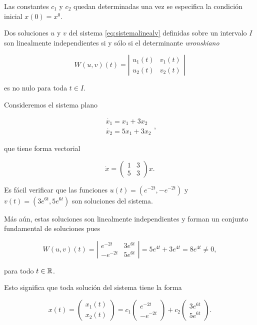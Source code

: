 Las constantes $c_1$ y $c_2$ quedan determinadas una vez se especifica la condición inicial $x(0) = x^0$.

\begin{lemma}
Dos soluciones $u$ y $v$ del sistema \ref{eq:sistemalinealv} definidas sobre un intervalo $I$ son linealmente independientes si y sólo si el determinante \emph{wronskiano}

$$ W(u,v)(t) = \left|
	\begin{array}{ll}
		u_1(t) & v_1(t) \\
		u_2(t) & v_2(t)
	\end{array}
\right|$$

es no nulo para toda $t \in I$.
\end{lemma}

\begin{example}
Consideremos el sistema plano

$$
	\begin{array}{l}
		\dot{x_1} = x_1 + 3x_2 \\
		\dot{x_2} = 5x_1 + 3x_2
	\end{array},
$$

que tiene forma vectorial

$$ \dot{x} = \left(
	\begin{array}{ll}
		1 & 3 \\ 5 & 3
	\end{array}
\right) x.$$

Es fácil verificar que las funciones $u(t) = (e^{-2t}, -e^{-2t})$ y $v(t) = (3e^{6t}, 5e^{6t})$ son soluciones del sistema.

Más aún, estas soluciones son linealmente independientes y forman un conjunto fundamental de soluciones pues

$$
	W(u,v)(t) =
\left|
	\begin{array}{ll}
		e^{-2t} & 3e^{6t} \\
		-e^{-2t} & 5e^{6t}
	\end{array}
\right| = 5e^{4t} + 3e^{4t} = 8e^{4t} \neq 0,
$$

para todo $t \in {\ensuremath{\mathbb{R}}}$.

Esto significa que toda solución del sistema tiene la forma

$$ x(t) = \left( \begin{array}{l} x_1(t) \\ x_2(t) \end{array} \right)
= c_1 \left( \begin{array}{l} e^{-2t} \\ -e^{-2t} \end{array} \right) + c_2 \left( \begin{array}{l} 3e^{6t} \\ 5e^{6t} \end{array} \right).$$
\end{example}

